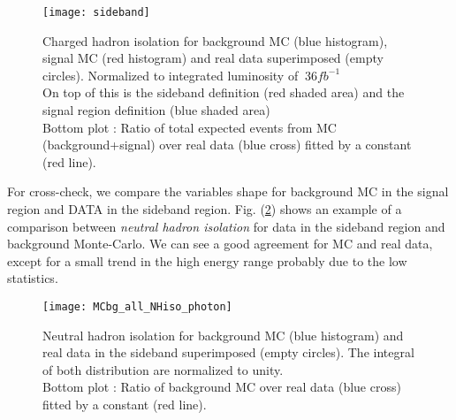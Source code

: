 
\begin{figure}[ht!]
  \centering
  \texttt{[image: sideband]}\\[1cm]
  \caption{Charged hadron isolation for background MC (blue histogram), signal MC (red histogram) and real data
  superimposed (empty circles). Normalized to integrated luminosity of $~36fb^{-1}$\\On top of this is the sideband
  definition (red shaded area) and the signal region definition (blue shaded area)\\Bottom plot : Ratio of total expected events from MC (background+signal) over real data (blue cross) fitted by a constant (red line).}
  \label{sideband}
\end{figure}

For cross-check, we compare the variables shape for background MC in the signal region and DATA in the sideband region.
Fig. (\ref{MCbg_all_NHiso_photon}) shows an example of a comparison between \emph{neutral hadron isolation} for data in the sideband region and background Monte-Carlo. We can see a good agreement for MC and real data, except for a small trend in the high energy range probably due to the low statistics.
\begin{figure}[h!]
  \centering
  \texttt{[image: MCbg\_all\_NHiso\_photon]}\\[1cm]
  \caption{Neutral hadron isolation for background MC (blue histogram) and real data in the sideband superimposed (empty circles). The integral of both distribution are normalized to unity.\\Bottom plot : Ratio of background MC over real data (blue cross) fitted by a constant (red line).}
  \label{MCbg_all_NHiso_photon}
\end{figure}

